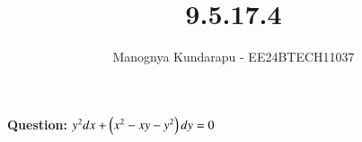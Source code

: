 \documentclass[journal]{IEEEtran}
\begin{document}

\vspace{3cm}

\title{9.5.17.4}
\author{Manognya Kundarapu - EE24BTECH11037
}
{\let\newpage\relax\maketitle}

\renewcommand{\thefigure}{\theenumi}
\renewcommand{\thetable}{\theenumi}
\setlength{\intextsep}{10pt} %


\renewcommand{\thetable}{\theenumi}
\textbf{Question:} $y^2dx+\left(x^2-xy-y^2\right)dy=0$\\
\end{document}

